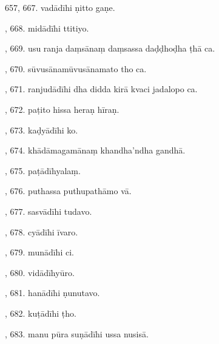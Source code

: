 657, 667. vadādīhi ṇitto gaṇe.\par {}, 668. midādīhi ttitiyo.\par {}, 669. usu ranja daṃsānaṃ daṃsassa daḍḍhoḍha ṭhā ca.\par {}, 670. sūvusānamūvusānamato tho ca.\par {}, 671. ranjudādīhi dha didda kirā kvaci jadalopo ca.\par {}, 672. paṭito hissa heraṇ hīraṇ.\par {}, 673. kaḍyādīhi ko.\par {}, 674. khādāmagamānaṃ khandha’ndha gandhā.\par {}, 675. paṭādīhyalaṃ.\par {}, 676. puthassa puthupathāmo vā.\par {}, 677. sasvādīhi tudavo.\par {}, 678. cyādīhi īvaro.\par {}, 679. munādīhi ci.\par {}, 680. vidādīhyūro.\par {}, 681. hanādīhi ṇunutavo.\par {}, 682. kuṭādīhi ṭho.\par {}, 683. manu pūra suṇādīhi ussa nusisā.\par \noindent
